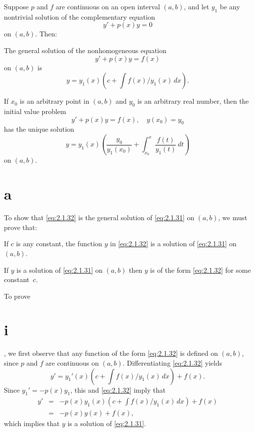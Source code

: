 \begin{theorem}
  \color{blue}
  \label{thmtype:2.1.2} Suppose $p$ and $f$ are continuous on an open interval $(a,b)$, and let
  $y_{1}$ be any nontrivial solution of the complementary equation
  \[
    y'+p(x)y=0
  \]
  on $(a,b)$. Then:
  \begin{alist}
    \item %
    The general solution of the nonhomogeneous equation
    \begin{equation}
      \label{eq:2.1.31}y'+p(x)y=f(x)
    \end{equation}
    on $(a,b)$ is
    \begin{equation}
      \label{eq:2.1.32}y=y_{1}(x)\left(c+\int f(x)/y_{1}(x)\,dx\right).
    \end{equation}

    \item %
    If $x_{0}$ is an arbitrary point in $(a,b)$ and $y_{0}$ is an arbitrary real number, then the
    initial value problem
    \[
      y'+p(x)y=f(x),\quad y(x_{0})=y_{0}
    \]
    has the unique solution
    \[
      y=y_{1}(x)\left(\frac{y_{0}}{y_{1}(x_{0})}+\int^{x}_{x_{0}}\frac{f(t)}{y_{1}(t)}\,dt\right)
    \]
    on $(a,b)$.
  \end{alist}
\end{theorem}

\proof \part{a} To show that \eqref{eq:2.1.32} is the general solution of \eqref{eq:2.1.31} on
$(a,b)$, we must prove that:

\begin{rmlist}
  \item %
  If $c$ is any constant, the function $y$ in \eqref{eq:2.1.32} is a solution of \eqref{eq:2.1.31}
  on $(a,b)$.

  \item %
  If $y$ is a solution of \eqref{eq:2.1.31} on $(a,b)$ then $y$ is of the form \eqref{eq:2.1.32} for
  some constant~$c$.
\end{rmlist}

To prove \part{i}, we first observe that any function of the form \eqref{eq:2.1.32} is defined on
$(a,b)$, since $p$ and $f$ are continuous on $(a,b)$. Differentiating \eqref{eq:2.1.32} yields
\[
  y'=y_{1}'(x)\left(c+\int f(x)/y_{1}(x)\, dx\right)+f(x).
\]
Since $y_{1}'=-p(x)y_{1}$, this and \eqref{eq:2.1.32} imply that
\begin{eqnarray*}
  y' & = & -p(x)y_{1}(x)\left(c+\int f(x)/y_{1}(x)\,dx\right)+f(x) \\
     & = & -p(x)y(x)+f(x),
\end{eqnarray*}
which implies that $y$ is a solution of \eqref{eq:2.1.31}.

